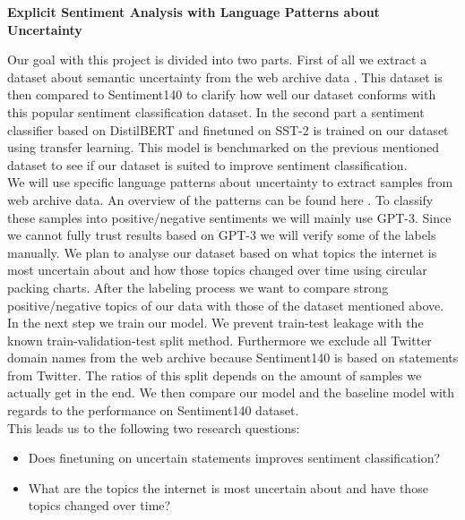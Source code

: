\documentclass[a4paper,12pt,numbers=enddot]{scrartcl}
\begin{document}
\singlespacing

\begin{Large}
\begin{center}
\textbf{Explicit Sentiment Analysis with Language Patterns about Uncertainty}
\end{center}
\end{Large}

Our goal with this project is divided into two parts. First of all we extract a dataset about semantic uncertainty from the web archive data \citep{Kiesel2018}. This dataset is then compared to Sentiment140 \citep{Sent140} to clarify how well our dataset conforms with this popular sentiment classification dataset. In the second part a sentiment classifier based on DistilBERT and finetuned on SST-2 \citep{DistilBert} is trained on our dataset using transfer learning. This model is benchmarked on the previous mentioned dataset to see if our dataset is suited to improve sentiment classification. 
\\

We will use specific language patterns about uncertainty to extract samples from web archive data. An overview of the patterns can be found here \citep[p. 43]{vincze2014uncertainty}. To classify these samples into positive/negative sentiments we will mainly use GPT-3. Since we cannot fully trust results based on GPT-3 we will verify some of the labels manually. We plan to analyse our dataset based on what topics the internet is most uncertain about and how those topics changed over time using circular packing charts. After the labeling process we want to compare strong positive/negative topics of our data with those of the dataset mentioned above.
\\

In the next step we train our model. We prevent train-test leakage with the known train-validation-test split method. Furthermore we exclude all Twitter domain names from the web archive because Sentiment140 is based on statements from Twitter. The ratios of this split depends on the amount of samples we actually get in the end. We then compare our model and the baseline model with regards to the performance on Sentiment140 dataset.
\\

This leads us to the following two research questions:
\begin{itemize}
	\setlength\itemsep{-5pt}
	\item Does finetuning on uncertain statements improves sentiment classification?
	\item What are the topics the internet is most uncertain about and have those topics changed over time?
\end{itemize}
\end{document}
